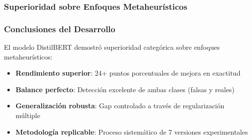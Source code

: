 \begin{table}[htbp]
\centering
{}
\caption{Métricas finales del modelo DistilBERT optimizado.}
\label{tab:metricas_finales}
\end{table}

\subsubsection{Superioridad sobre Enfoques Metaheurísticos}

\begin{table}[htbp]
\centering
{}
\caption{Comparación DistilBERT vs. mejor algoritmo metaheurístico.}
\label{tab:comparacion_final}
\end{table}

\subsubsection{Conclusiones del Desarrollo}

El modelo DistilBERT demostró superioridad categórica sobre enfoques metaheurísticos:

\begin{itemize}
    \item \textbf{Rendimiento superior}: 24+ puntos porcentuales de mejora en exactitud
    \item \textbf{Balance perfecto}: Detección excelente de ambas clases (falsas y reales)
    \item \textbf{Generalización robusta}: Gap controlado a través de regularización múltiple
    \item \textbf{Metodología replicable}: Proceso sistemático de 7 versiones experimentales
\end{itemize}

